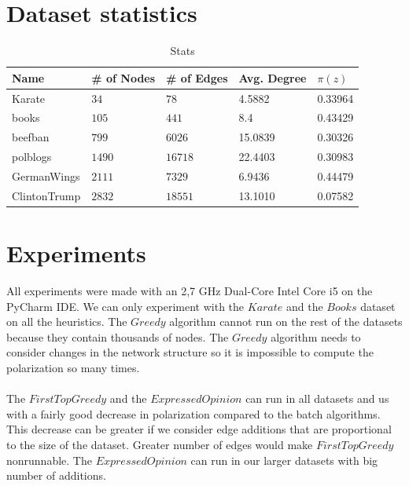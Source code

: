 \section{Dataset statistics}
\label{sec:stats}

\begin{table}[H]
 \centering
 \caption{Stats}
 \label{tab:statistics}
 \begin{tabular}{| l || l | l | l | l |}
 \hline
  Name & \# of Nodes & \# of Edges & Avg. Degree & $\pi(z)$\\
  \hline
  \hline
  Karate & $34$ & $78$ & 4.5882 &  0.33964\\
  \hline
    books & $105$ & $441$ & 8.4 &  0.43429\\
  \hline
    beefban & $799$ & $6026$ & 15.0839 &  0.30326\\
  \hline
  polblogs & $1490$ & $16718$ & 22.4403 &  0.30983\\
  \hline
  GermanWings & $2111$ & $7329$ & 6.9436 &  0.44479\\
  \hline
  ClintonTrump & $2832$ & $18551$ & 13.1010 &  0.07582\\
  \hline
 \end{tabular}
 \end{table}
 
\vspace{20pt}
\clearpage

\section{Experiments}
\label{sec:experim}

All experiments were made with an 2,7 GHz Dual-Core Intel Core i5 on the PyCharm IDE. We can only experiment with the $Karate$ and the $Books$ dataset on all the heuristics. The $Greedy$ algorithm cannot run on the rest of the datasets because they contain thousands of nodes. The $Greedy$ algorithm needs to consider changes in the network structure so it is impossible to compute the polarization so many times.
\\
\\ 
The $FirstTopGreedy$ and the $Expressed Opinion$ can run in all datasets and us with a fairly good decrease in polarization compared to the batch algorithms. This decrease can be greater if we consider edge additions that are proportional to the size of the dataset. Greater number of edges would make $FirstTopGreedy$ nonrunnable. The $Expressed Opinion$ can run in our larger datasets with big number of additions.
\clearpage

